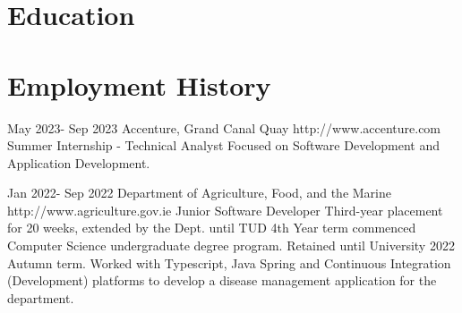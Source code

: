 \documentclass[10pt]{article} %
\begin{document}

\section{Education}







\section{Employment History}


\job
{May 2023}{- Sep 2023} {Accenture, Grand Canal Quay} {http://www.accenture.com}
{Summer Internship - Technical Analyst} {Focused on Software Development and
Application Development.}


\job
{Jan 2022}{- Sep 2022} {Department of Agriculture, Food, and the Marine}
{http://www.agriculture.gov.ie} {Junior Software Developer} {Third-year
placement for 20 weeks, extended by the Dept. until TUD 4th Year term commenced
Computer Science undergraduate degree program. Retained until University 2022
Autumn term. Worked with Typescript, Java Spring and Continuous Integration
(Development) platforms to develop a disease management application for the
department.}
\end{document}
